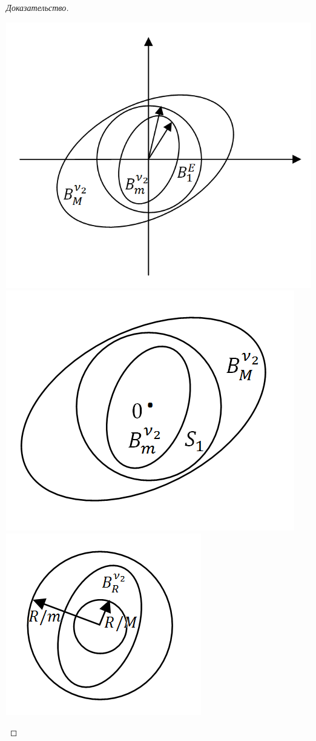\documentclass[12pt]{article}
\theoremstyle{definition}
\numberwithin{equation}{section}
\begin{document}
\begin{proof}[Доказательство]
\begin{enumerate}
			\begin{center}\includegraphics[scale=0.55]{l5_7.png}\includegraphics[scale=0.55]{l5_9.png}\includegraphics[scale=0.65]{l5_8.png}\end{center}
			

\end{enumerate}
\end{proof}
\end{document}
